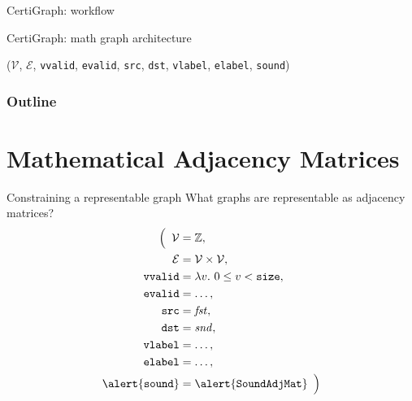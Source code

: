 \documentclass[usenames, xcolor=dvipsnames]{beamer}
\newcommand{\m}[1]{\ensuremath{\mathit{#1}}} %
\begin{document}
\begin{frame}{CertiGraph: workflow}
  
\end{frame}

\begin{frame}{CertiGraph: math graph architecture}
  
\centering
\colorbox{lightg}{\scalebox{.85}{}}
  
\vspace{1em}
($\mathcal{V}$, $\mathcal{E}$, \texttt{vvalid}, \texttt{evalid},
\texttt{src}, \texttt{dst}, \texttt{vlabel}, \texttt{elabel}, 
\texttt{sound})
\end{frame}

\begin{frame}
\frametitle{Outline}
\tableofcontents
\end{frame}

\section{Mathematical Adjacency Matrices}

\begin{frame}{Constraining a representable graph}
What graphs are representable as adjacency matrices? \\
\pause \bigskip
\vspace{-2em}
\begin{align*}
\Big(\hspace{0.5em}\mathcal{V}&=\mathbb{Z}, \\
\mathcal{E}&=\mathcal{V} \times \mathcal{V}, \\
\texttt{vvalid}&=\lambda v.~0 \le v < \texttt{size}, \\ 
\texttt{evalid}&=\ldots, \\
\texttt{src}&=\m{fst}, \\
\texttt{dst}&=\m{snd}, \\
\texttt{vlabel}&=\ldots, \\
\texttt{elabel}&=\ldots, \\
\alert{\texttt{sound}}&=\alert{\texttt{SoundAdjMat}}\hspace{0.5em}\Big) 
\end{align*}

\end{frame}
\end{document}
